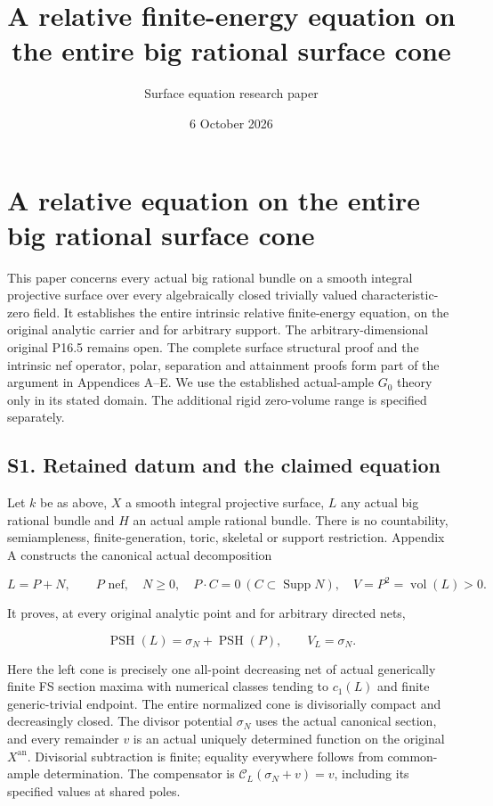 \documentclass[
  10pt,
]{article}
\title{A relative finite-energy equation on the entire big rational
surface cone}
\author{Surface equation research paper}
\date{6 October 2026}
\begin{document}
\maketitle

\section{A relative equation on the entire big rational surface
cone}\label{a-relative-equation-on-the-entire-big-rational-surface-cone}

This paper concerns every actual big rational bundle on a smooth integral
projective surface over every algebraically closed trivially valued
characteristic-zero field. It establishes the entire intrinsic relative
finite-energy equation, on the original analytic carrier and for arbitrary
support. The arbitrary-dimensional original P16.5 remains open. The complete
surface structural proof and the intrinsic nef operator, polar, separation
and attainment proofs form part of the argument in Appendices A--E.
We use the established actual-ample \(G_0\) theory only in its stated domain.
The additional rigid zero-volume range is specified separately.

\subsection{S1. Retained datum and the claimed
equation}\label{s1.-retained-datum-and-the-claimed-equation}

Let \(k\) be as above, \(X\) a smooth integral projective surface, \(L\)
any actual big rational bundle and \(H\) an actual ample rational
bundle. There is no countability, semiampleness, finite-generation,
toric, skeletal or support restriction. Appendix A constructs the
canonical actual decomposition

\[L=P+N,\qquad P\text{ nef},\quad N\geq0,\quad P\cdot C=0\ (C\subset\operatorname{Supp}N),\quad V=P^2=\operatorname{vol}(L)>0.\]

It proves, at every original analytic point and for arbitrary directed
nets,

\[\operatorname{PSH}(L)=\sigma_N+\operatorname{PSH}(P),\qquad V_L=\sigma_N.\]

Here the left cone is precisely one all-point decreasing net of actual
generically finite FS section maxima with numerical classes tending to
\(c_1(L)\) and finite generic-trivial endpoint. The entire normalized
cone is divisorially compact and decreasingly closed. The divisor
potential \(\sigma_N\) uses the actual canonical section, and every
remainder \(v\) is an actual uniquely determined function on the
original \(X^{\mathrm{an}}\). Divisorial subtraction is finite; equality
everywhere follows from common-ample determination. The compensator is
\(\mathcal C_L(\sigma_N+v)=v\), including its specified values at shared
poles.
\end{document}
